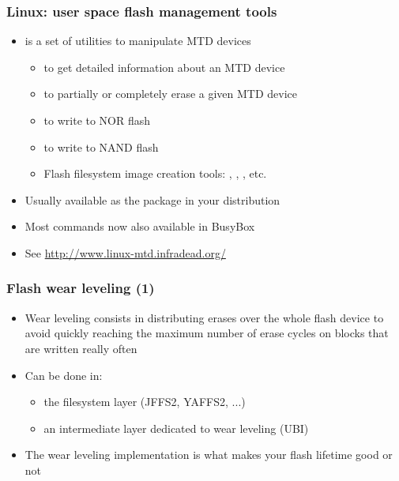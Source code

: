 \begin{frame}
  \frametitle{Linux: user space flash management tools}
  \begin{itemize}
  \item {} is a set of utilities to manipulate MTD devices
    \begin{itemize}
    \item {} to get detailed information about an MTD device
    \item {} to partially or completely erase a given
      MTD device
    \item {} to write to NOR flash
    \item {} to write to NAND flash
    \item Flash filesystem image creation tools: ,
      , , etc.
    \end{itemize}
  \item Usually available as the  package in your distribution
  \item Most commands now also available in BusyBox
  \item See \url{http://www.linux-mtd.infradead.org/}
  \end{itemize}
\end{frame}


\begin{frame}
  \frametitle{Flash wear leveling (1)}
  \begin{itemize}
  \item Wear leveling consists in distributing erases over the whole
    flash device to avoid quickly reaching the maximum number of erase
    cycles on blocks that are written really often
  \item Can be done in:
    \begin{itemize}
    \item the filesystem layer (JFFS2, YAFFS2, ...)
    \item an intermediate layer dedicated to wear leveling (UBI)
    \end{itemize}
  \item The wear leveling implementation is what makes your flash
    lifetime good or not
  \end{itemize}
\end{frame}

